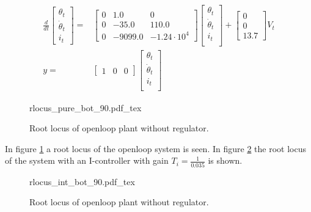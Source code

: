 \documentclass[../../../Main]{subfiles}
\begin{document}
\begin{equation}
      \label{eq:bottom_state_eq_2}
      \begin{split}
      \frac{d}{dt}
    \begin{bmatrix}
        \theta_t \\
        \dot \theta_t \\
        i_t
    \end{bmatrix}
    =&
    \begin{bmatrix}0 & 1.0 & 0\\ 0 & -35.0 & 110.0\\ 0 & -9099.0 & -1.24\cdot10^4\end{bmatrix}
    \begin{bmatrix}
        \theta_t \\
        \dot \theta_t \\
        i_t \\
    \end{bmatrix}
    +
    \begin{bmatrix}
      0\\ 0\\ 13.7
    \end{bmatrix}
    V_t
\\
      y =&
    \begin{bmatrix}
        1 & 0 & 0
    \end{bmatrix}
    \begin{bmatrix}
        \theta_t \\
        \dot \theta_t\\
        i_t\\
    \end{bmatrix}
    \end{split}
\end{equation}


\begin{figure}[H]
\centering
\def\svgwidth{\textwidth}
{rlocus_pure_bot_90.pdf_tex}
\caption{Root locus of openloop plant without regulator.}
\label{fig:rlocus_pure_bot_90}
\end{figure}

In figure \ref{fig:rlocus_pure_bot_90} a root locus of the openloop system is seen. In figure \ref{fig:rlocus_int_bot_90} the root locus of the system with an I-controller with gain $T_i = \frac{1}{0.035}$ is shown.

\begin{figure}[H]
\centering
\def\svgwidth{\textwidth}
{rlocus_int_bot_90.pdf_tex}
\caption{Root locus of openloop plant without regulator.}
\label{fig:rlocus_int_bot_90}
\end{figure}
\end{document}

